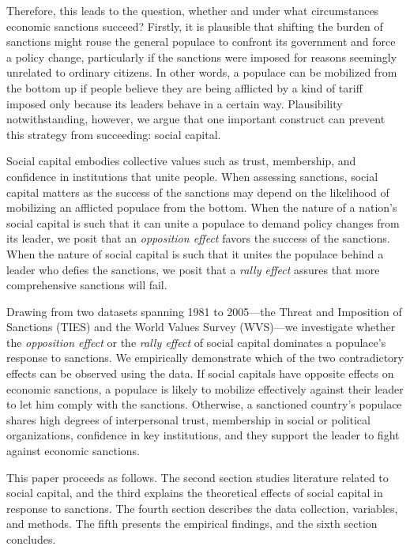 \documentclass[12pt,]{article}
\begin{document}
Therefore, this leads to the question, whether and under what
circumstances economic sanctions succeed? Firstly, it is plausible that
shifting the burden of sanctions might rouse the general populace to
confront its government and force a policy change, particularly if the
sanctions were imposed for reasons seemingly unrelated to ordinary
citizens. In other words, a populace can be mobilized from the bottom up
if people believe they are being afflicted by a kind of tariff imposed
only because its leaders behave in a certain way. Plausibility
notwithstanding, however, we argue that one important construct can
prevent this strategy from succeeding: social capital.

Social capital embodies collective values such as trust, membership, and
confidence in institutions that unite people. When assessing sanctions,
social capital matters as the success of the sanctions may depend on the
likelihood of mobilizing an afflicted populace from the bottom. When the
nature of a nation's social capital is such that it can unite a populace
to demand policy changes from its leader, we posit that an
\emph{opposition effect} favors the success of the sanctions. When the
nature of social capital is such that it unites the populace behind a
leader who defies the sanctions, we posit that a \emph{rally effect}
assures that more comprehensive sanctions will fail.

Drawing from two datasets spanning 1981 to 2005---the Threat and
Imposition of Sanctions (TIES) and the World Values Survey (WVS)---we
investigate whether the \emph{opposition effect} or the \emph{rally
effect} of social capital dominates a populace's response to sanctions.
We empirically demonstrate which of the two contradictory effects can be
observed using the data. If social capitals have opposite effects on
economic sanctions, a populace is likely to mobilize effectively against
their leader to let him comply with the sanctions. Otherwise, a
sanctioned country's populace shares high degrees of interpersonal
trust, membership in social or political organizations, confidence in
key institutions, and they support the leader to fight against economic
sanctions.

This paper proceeds as follows. The second section studies literature
related to social capital, and the third explains the theoretical
effects of social capital in response to sanctions. The fourth section
describes the data collection, variables, and methods. The fifth
presents the empirical findings, and the sixth section concludes.
\end{document}
